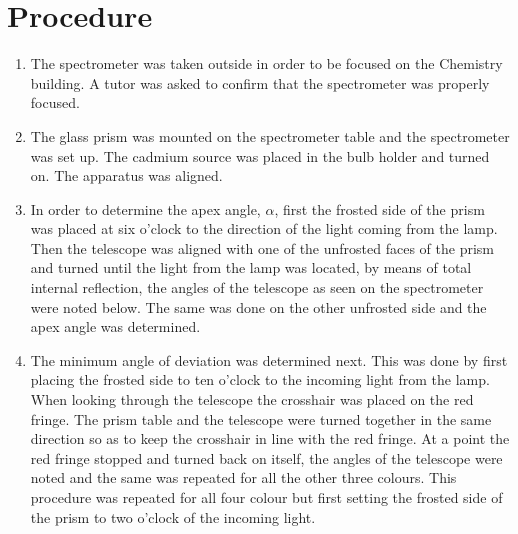 \documentclass[12pt, a4paper]{article}
\begin{document}
\section*{Procedure}
\begin{enumerate}
    \item The spectrometer was taken outside in order to be focused on the Chemistry building. A tutor was asked to confirm that the spectrometer was properly focused.
    \item The glass prism was mounted on the spectrometer table and the spectrometer was set up. The cadmium source was placed in the bulb holder and turned on. The apparatus was aligned.
    \item In order to determine the apex angle, $\alpha$, first the frosted side of the prism was placed at six o'clock to the direction of the light coming from the lamp. Then the telescope was aligned with one of the unfrosted faces of the prism and turned until the light from the lamp was located, by means of total internal reflection, the angles of the telescope as seen on the spectrometer were noted below. The same was done on the other unfrosted side and the apex angle was determined.
    \item The minimum angle of deviation was determined next. This was done by first placing the frosted side to ten o'clock to the incoming light from the lamp. When looking through the telescope the crosshair was placed on the red fringe. The prism table and the telescope were turned together in the same direction so as to keep the crosshair in line with the red fringe. At a point the red fringe stopped and turned back on itself, the angles of the telescope were noted and the same was repeated for all the other three colours. This procedure was repeated for all four colour but first setting the frosted side of the prism to two o'clock of the incoming light.
\end{enumerate}
\end{document}

